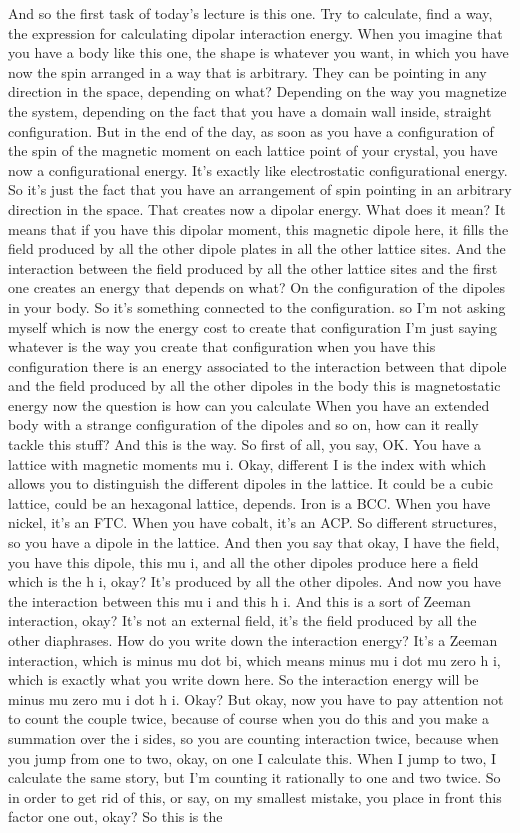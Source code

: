And so the first task of today's lecture is this one. Try to calculate, find a way, the expression for calculating dipolar interaction energy. When you imagine that you have a body like this one, the shape is whatever you want, in which you have now the spin arranged in a way that is arbitrary. They can be pointing in any direction in the space, depending on what? Depending on the way you magnetize the system, depending on the fact that you have a domain wall inside, straight configuration. But in the end of the day, as soon as you have a configuration of the spin of the magnetic moment on each lattice point of your crystal, you have now a configurational energy. It's exactly like electrostatic configurational energy. So it's just the fact that you have an arrangement of spin pointing in an arbitrary direction in the space. That creates now a dipolar energy. What does it mean? It means that if you have this dipolar moment, this magnetic dipole here, it fills the field produced by all the other dipole plates in all the other lattice sites. And the interaction between the field produced by all the other lattice sites and the first one creates an energy that depends on what? On the configuration of the dipoles in your body. So it's something connected to the configuration. so I'm not asking myself which is now the energy cost to create that configuration I'm just saying whatever is the way you create that configuration when you have this configuration there is an energy associated to the interaction between that dipole and the field produced by all the other dipoles in the body this is magnetostatic energy now the question is how can you calculate When you have an extended body with a strange configuration of the dipoles and so on, how can it really tackle this stuff? And this is the way. So first of all, you say, OK. You have a lattice with magnetic moments mu i. Okay, different I is the index with which allows you to distinguish the different dipoles in the lattice. It could be a cubic lattice, could be an hexagonal lattice, depends. Iron is a BCC. When you have nickel, it's an FTC. When you have cobalt, it's an ACP. So different structures, so you have a dipole in the lattice. And then you say that okay, I have the field, you have this dipole, this mu i, and all the other dipoles produce here a field which is the h i, okay? It's produced by all the other dipoles. And now you have the interaction between this mu i and this h i. And this is a sort of Zeeman interaction, okay? It's not an external field, it's the field produced by all the other diaphrases. How do you write down the interaction energy? It's a Zeeman interaction, which is minus mu dot bi, which means minus mu i dot mu zero h i, which is exactly what you write down here. So the interaction energy will be minus mu zero mu i dot h i. Okay? But okay, now you have to pay attention not to count the couple twice, because of course when you do this and you make a summation over the i sides, so you are counting interaction twice, because when you jump from one to two, okay, on one I calculate this. When I jump to two, I calculate the same story, but I'm counting it rationally to one and two twice. So in order to get rid of this, or say, on my smallest mistake, you place in front this factor one out, okay? So this is the 